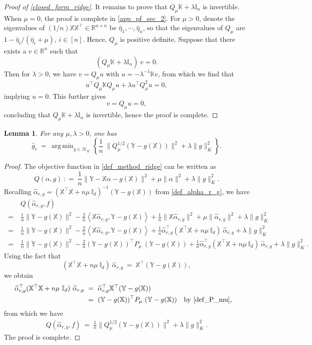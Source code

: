 \documentclass[11pt,twoside]{article}
\newtheorem{lemma}{Lemma}
\DeclareMathOperator*{\argmin}{arg\,min}
\def\KK{\mathbb{K}}
\def\II{\mathbb{I}}
\def\YY{\mathbb{Y}}
\def\XX{\mathbb{X}}
\def\RR{\mathbb{R}}
\def\cH{\mathcal H}
\def\wh{\widehat}
\def\T{\top}
\def\l{\left}
\def\r{\right}
\def\b{\big}
\begin{document}
\begin{proof}[Proof of \eqref{closed_form_ridge}]
It remains to prove that $Q_\mu  \KK+\lambda \II_n $ is invertible. When $\mu =0$, the proof is complete in \cref{app_pf_sec_2}. 
For $\mu >0$,  denote the eigenvalues of  $(1/n)\XX \XX^\T \in \RR^{n\times n}$ be $\wh \eta_1,\cdots,\wh \eta_n$, so that the eigenvalues of  $Q_\mu$ are
$1- \wh \eta_i/ (\wh \eta_i +\mu),~  i\in [n]$. Hence, $Q_\mu$ is positive  definite. 
Suppose that there exists a $v\in \RR^n$ such that
\[
(  Q_\mu  \KK + \lambda \II_n )~ v  = 0. 
\]
Then for $\lambda>0$, we have $v =  Q_\mu  u$ with $u = - \lambda^{-1} \KK v$, from which we find that 
\[
u^\T  Q_{\mu} \KK Q_\mu  u  +  \lambda u^\T Q_\mu^2  u=0,
\]
implying $u =0$.
This further gives
\[
 v =Q_\mu   u =0, 
\]
concluding that $ Q_\mu \KK + \lambda \II_n$ is invertible,
hence the proof is complete. 
\end{proof}


\begin{lemma}\label{lem_ridge}
For any $\mu, \lambda>0$, one has
   \[
\wh g_r
~ =~ \argmin_{ g \in \cH_K} \l\{
\frac{1}{n}~ \b\|Q_\mu ^{1/2}  (\YY-g(\XX)) \b\|^2 + \lambda\|g\|_K^2 
\r\}.
\]
\end{lemma}
\begin{proof}
  The objective function in \eqref{def_method_ridge} can be written as 
\[
Q (\alpha, g) ~ : =~
\frac{1}{n} \| \YY-\XX \alpha-g(\XX)\|^2+ \mu\|\alpha \| ^2+\lambda\|g\|_K^2. 
\]
Recalling  $\wh \alpha_{r,g} = (\XX^\T \XX + n\mu~  \II_d)^{-1}  (\YY-g(\XX)) $ from \eqref{def_alpha_r_g}, we have
\begin{align*}
 & Q(\wh \alpha_{r,g},f)\\ 
 ~=~  & \frac{1}{n} \|\YY - g(\XX)\|^2
- \frac{2}{n}\l \langle  \XX \wh \alpha_{r,g},  \YY-g(\XX)\r\rangle
+\frac{1}{n} \| \XX \wh \alpha_{r,g}\|^2
+ \mu \|\wh \alpha_{r,g}\|^2 +\lambda \|g\| _K^2
\\
~=~  &   \frac{1}{n} \|\YY- g(\XX)\|^2  -\frac{2}{n}\l \langle  \XX \wh \alpha_{r,g},  \YY-g(\XX)\r\rangle 
+ \frac{1}{n}  \wh \alpha_{r,g}^\T ( \XX^\T \XX + n \mu~ \II _d)~ \wh \alpha_{r,g} + \lambda\| g\| _K^2\\
~=~  &   \frac{1}{n} \|\YY- g(\XX)\|^2  -\frac{2}{n}(\YY-g(\XX))^\T P_\mu ~ (\YY-g(\XX))
+ \frac{1}{n}  \wh \alpha_{r,g}^\T ( \XX^\T \XX + n \mu~ \II _d)~ \wh \alpha_{r,g} + \lambda\| g\| _K^2.
\end{align*}
Using the fact  that
\[
(\XX^\T \XX+ n \mu ~ \II _d) ~ \wh \alpha_{r,g} ~=~  \XX^\T (\YY-g(\XX)),
\]
we obtain
\begin{align*}
     \wh \alpha_{r,g}^\T ( \XX^\T \XX + n \mu~ \II _d)~ \wh \alpha_{r,g}     &  ~=~ \wh \alpha_{r,g}^\T  \XX^\T (\YY-g(\XX))\\
     & ~=~  (\YY-g(\XX))^\T P_\mu ~ (\YY-g(\XX))&&\text{by \eqref{def_P_mu},}
\end{align*}
from which we have
\begin{align*}
    Q(\wh \alpha_{r,g},f) 
    ~=~
\frac{1}{n}\b \| Q_\mu^{1/2}(\YY-g(\XX) )\b\|^2 +\lambda \| g\|_K^2.
\end{align*}
The proof is complete. 
\end{proof}
\end{document}
